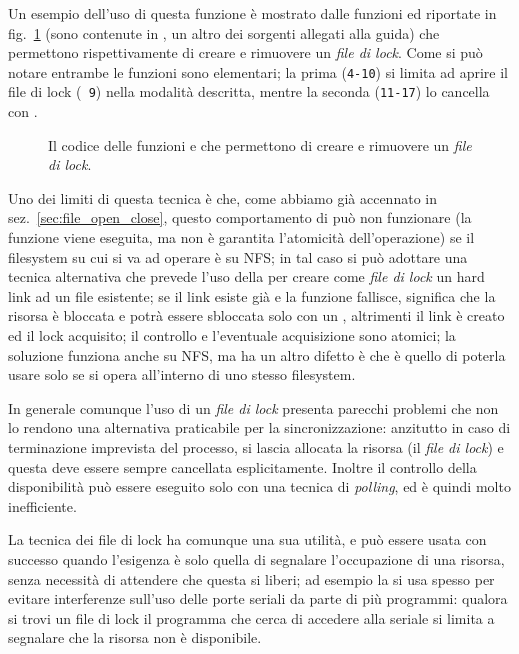Un esempio dell'uso di questa funzione è mostrato dalle funzioni
 ed  riportate in fig.~\ref{fig:ipc_file_lock}
(sono contenute in , un altro dei sorgenti allegati alla
guida) che permettono rispettivamente di creare e rimuovere un \textsl{file di
  lock}. Come si può notare entrambe le funzioni sono elementari; la prima
(\texttt{\small 4-10}) si limita ad aprire il file di lock (\texttt{\small
  9}) nella modalità descritta, mentre la seconda (\texttt{\small 11-17}) lo
cancella con .

\begin{figure}[!htbp]
  \footnotesize \centering
  \begin{minipage}[c]{\codesamplewidth}
  \end{minipage} 
  \normalsize 
  \caption{Il codice delle funzioni  e  che
    permettono di creare e rimuovere un \textsl{file di lock}.}
  \label{fig:ipc_file_lock}
\end{figure}

Uno dei limiti di questa tecnica è che, come abbiamo già accennato in
sez.~\ref{sec:file_open_close}, questo comportamento di  può non
funzionare (la funzione viene eseguita, ma non è garantita l'atomicità
dell'operazione) se il filesystem su cui si va ad operare è su NFS; in tal
caso si può adottare una tecnica alternativa che prevede l'uso della
 per creare come \textsl{file di lock} un hard link ad un file
esistente; se il link esiste già e la funzione fallisce, significa che la
risorsa è bloccata e potrà essere sbloccata solo con un ,
altrimenti il link è creato ed il lock acquisito; il controllo e l'eventuale
acquisizione sono atomici; la soluzione funziona anche su NFS, ma ha un altro
difetto è che è quello di poterla usare solo se si opera all'interno di uno
stesso filesystem.

In generale comunque l'uso di un \textsl{file di lock} presenta parecchi
problemi che non lo rendono una alternativa praticabile per la
sincronizzazione: anzitutto in caso di terminazione imprevista del processo,
si lascia allocata la risorsa (il \textsl{file di lock}) e questa deve essere
sempre cancellata esplicitamente.  Inoltre il controllo della disponibilità
può essere eseguito solo con una tecnica di \textit{polling}, ed è quindi
molto inefficiente.

La tecnica dei file di lock ha comunque una sua utilità, e può essere usata
con successo quando l'esigenza è solo quella di segnalare l'occupazione di una
risorsa, senza necessità di attendere che questa si liberi; ad esempio la si
usa spesso per evitare interferenze sull'uso delle porte seriali da parte di
più programmi: qualora si trovi un file di lock il programma che cerca di
accedere alla seriale si limita a segnalare che la risorsa non è disponibile.

